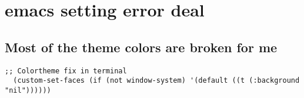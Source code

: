 \documentclass[11pt]{article}
\author{黄金贵}
\date{\today}
\title{}
\begin{document}
\tableofcontents

\section{emacs setting error deal}
\label{sec:org8154cab}
\subsection{Most of the theme colors are broken for me}
\label{sec:org8a237ca}

\begin{verbatim}
;; Colortheme fix in terminal
  (custom-set-faces (if (not window-system) '(default ((t (:background "nil"))))))
\end{verbatim}
\end{document}
